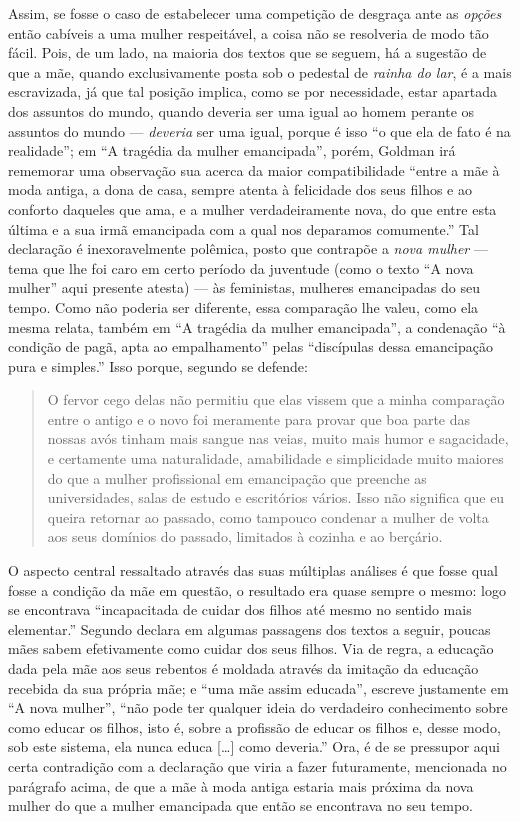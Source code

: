Assim, se fosse o caso de
estabelecer uma competição de desgraça ante as \textit{opções} então cabíveis
a uma mulher respeitável, a coisa não se resolveria de modo tão fácil.
Pois, de um lado, na maioria dos textos que se seguem, há a sugestão de
que a mãe, quando exclusivamente posta sob o pedestal de \textit{rainha do
lar}, é a mais escravizada, já que tal posição implica, como se por
necessidade, estar apartada dos assuntos do mundo, quando deveria ser
uma igual ao homem perante os assuntos do mundo --- \textit{deveria} ser
uma igual, porque é isso ``o que ela de fato é na realidade''; em ``A
tragédia da mulher emancipada'', porém, Goldman irá rememorar uma
observação sua acerca da maior compatibilidade ``entre a mãe à moda
antiga, a dona de casa, sempre atenta à felicidade dos seus filhos e ao
conforto daqueles que ama, e a mulher verdadeiramente nova, do que entre
esta última e a sua irmã emancipada com a qual nos deparamos
comumente.'' Tal declaração é inexoravelmente polêmica, posto que
contrapõe a \textit{nova mulher} --- tema que lhe foi caro em certo período da
juventude (como o texto ``A nova mulher'' aqui presente atesta) --- às
feministas, mulheres emancipadas do seu tempo. Como não poderia ser
diferente, essa comparação lhe valeu, como ela mesma relata, também em
``A tragédia da mulher emancipada'', a condenação ``à condição de pagã,
apta ao empalhamento'' pelas ``discípulas dessa emancipação pura e
simples.'' Isso porque, segundo se defende:

\begin{quote}
O fervor cego delas não permitiu que elas vissem que a minha comparação
entre o antigo e o novo foi meramente para provar que boa parte das
nossas avós tinham mais sangue nas veias, muito mais humor e sagacidade,
e certamente uma naturalidade, amabilidade e simplicidade muito maiores
do que a mulher profissional em emancipação que preenche as
universidades, salas de estudo e escritórios vários. Isso não significa
que eu queira retornar ao passado, como tampouco condenar a mulher de
volta aos seus domínios do passado, limitados à cozinha e ao berçário.
\end{quote}

O aspecto central ressaltado através das suas múltiplas análises é que
fosse qual fosse a condição da mãe em questão, o resultado era quase
sempre o mesmo: logo se encontrava ``incapacitada de cuidar dos filhos
até mesmo no sentido mais elementar.'' Segundo declara em algumas
passagens dos textos a seguir, poucas mães sabem efetivamente como
cuidar dos seus filhos. Via de regra, a educação dada pela mãe aos seus
rebentos é moldada através da imitação da educação recebida da sua
própria mãe; e ``uma mãe assim educada'', escreve justamente em ``A nova
mulher'', ``não pode ter qualquer ideia do verdadeiro conhecimento sobre
como educar os filhos, isto é, sobre a profissão de educar os filhos e,
desse modo, sob este sistema, ela nunca educa {[}\ldots{]} como deveria.''
Ora, é de se pressupor aqui certa contradição com a declaração que viria
a fazer futuramente, mencionada no parágrafo acima, de que a mãe à moda
antiga estaria mais próxima da nova mulher do que a mulher emancipada
que então se encontrava no seu tempo. 

